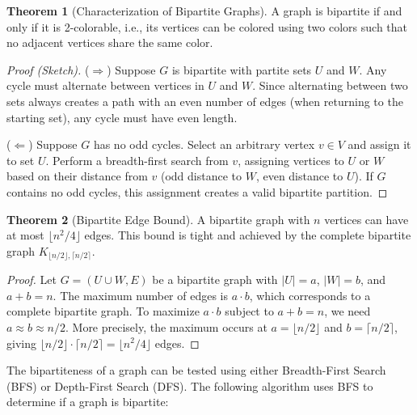 \documentclass{article}
\theoremstyle{definition}
\newtheorem{theorem}{Theorem}
\begin{document}
\begin{theorem}[Characterization of Bipartite Graphs]
A graph is bipartite if and only if it is 2-colorable, i.e., its vertices can be colored using two colors such that no adjacent vertices share the same color.
\end{theorem}
\begin{proof}[Proof (Sketch)]
($\Rightarrow$) Suppose $G$ is bipartite with partite sets $U$ and $W$. Any cycle must alternate between vertices in $U$ and $W$. Since alternating between two sets always creates a path with an even number of edges (when returning to the starting set), any cycle must have even length.

($\Leftarrow$) Suppose $G$ has no odd cycles. Select an arbitrary vertex $v \in V$ and assign it to set $U$. Perform a breadth-first search from $v$, assigning vertices to $U$ or $W$ based on their distance from $v$ (odd distance to $W$, even distance to $U$). If $G$ contains no odd cycles, this assignment creates a valid bipartite partition.
\end{proof}

\begin{theorem}[Bipartite Edge Bound]
A bipartite graph with $n$ vertices can have at most $\lfloor n^2/4 \rfloor$ edges. This bound is tight and achieved by the complete bipartite graph $K_{\lfloor n/2 \rfloor, \lceil n/2 \rceil}$.
\end{theorem}

\begin{proof}
Let $G = (U \cup W, E)$ be a bipartite graph with $|U| = a$, $|W| = b$, and $a + b = n$. The maximum number of edges is $a \cdot b$, which corresponds to a complete bipartite graph. To maximize $a \cdot b$ subject to $a + b = n$, we need $a \approx b \approx n/2$. More precisely, the maximum occurs at $a = \lfloor n/2 \rfloor$ and $b = \lceil n/2 \rceil$, giving $\lfloor n/2 \rfloor \cdot \lceil n/2 \rceil = \lfloor n^2/4 \rfloor$ edges.
\end{proof}

The bipartiteness of a graph can be tested using either Breadth-First Search (BFS) or Depth-First Search (DFS). The following algorithm uses BFS to determine if a graph is bipartite:
\end{document}
